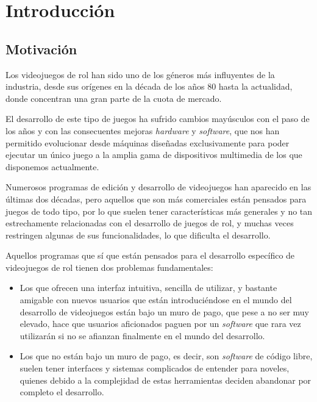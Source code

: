 \chapter{Introducción}
\label{cap:introduccion}


\section{Motivación}
Los videojuegos de rol han sido uno de los géneros más influyentes de la industria, desde sus orígenes en la década de los años 80 hasta la actualidad, donde concentran una gran parte de la cuota de mercado.

\smallskip

El desarrollo de este tipo de juegos ha sufrido cambios mayúsculos con el paso de los años y con las consecuentes mejoras \textit{hardware} y \textit{software}, que nos han permitido evolucionar desde máquinas diseñadas exclusivamente para poder ejecutar un único juego a la amplia gama de dispositivos multimedia de los que disponemos actualmente.

\medskip

Numerosos programas de edición y desarrollo de videojuegos han aparecido en las últimas dos décadas, pero aquellos que son más comerciales están pensados para juegos de todo tipo, por lo que suelen tener características más generales y no tan estrechamente relacionadas con el desarrollo de juegos de rol, y muchas veces restringen algunas de sus funcionalidades, lo que dificulta el desarrollo.

\smallskip

Aquellos programas que sí que están pensados para el desarrollo específico de videojuegos de rol tienen dos problemas fundamentales:
\begin{itemize}
	\item Los que ofrecen una interfaz intuitiva, sencilla de utilizar, y bastante amigable con nuevos usuarios que están introduciéndose en el mundo del desarrollo de videojuegos están bajo un muro de pago, que pese a no ser muy elevado, hace que usuarios aficionados paguen por un \textit{software} que rara vez utilizarán si no se afianzan finalmente en el mundo del desarrollo.
	\item Los que no están bajo un muro de pago, es decir, son \textit{software} de código libre, suelen tener interfaces y sistemas complicados de entender para noveles, quienes debido a la complejidad de estas herramientas deciden abandonar por completo el desarrollo.
\end{itemize}

